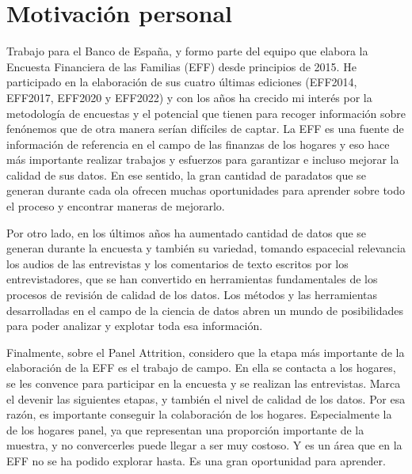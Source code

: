 \section{Motivación personal}

Trabajo para el Banco de España, y formo parte del equipo que elabora la Encuesta Financiera de las Familias (EFF) desde principios de 2015. He participado en la elaboración de sus cuatro últimas ediciones (EFF2014, EFF2017, EFF2020 y EFF2022) y con los años ha crecido mi interés por la metodología de encuestas y el potencial que tienen para recoger información sobre fenónemos que de otra manera serían difíciles de captar. La EFF es una fuente de información de referencia en el campo de las finanzas de los hogares y eso hace más importante realizar trabajos y esfuerzos para garantizar e incluso mejorar la calidad de sus datos. En ese sentido, la gran cantidad de paradatos que se generan durante cada ola ofrecen muchas oportunidades para aprender sobre todo el proceso y encontrar maneras de mejorarlo.

Por otro lado, en los últimos años ha aumentado cantidad de datos que se generan durante la encuesta y también su variedad, tomando espacecial relevancia los audios de las entrevistas y los comentarios de texto escritos por los entrevistadores, que se han convertido en herramientas fundamentales de los procesos de revisión de calidad de los datos. Los métodos y las herramientas desarrolladas en el campo de la ciencia de datos abren un mundo de posibilidades para poder analizar y explotar toda esa información.

Finalmente, sobre el Panel Attrition, considero que la etapa más importante de la elaboración de la EFF es el trabajo de campo. En ella se contacta a los hogares, se les convence para participar en la encuesta y se realizan las entrevistas. Marca el devenir las siguientes etapas, y también el nivel de calidad de los datos. Por esa razón, es importante conseguir la colaboración de los hogares. Especialmente la de los hogares panel, ya que representan una proporción importante de la muestra, y no convercerles puede llegar a ser muy costoso. Y es un área que en la EFF no se ha podido explorar hasta. Es una gran oportunidad para aprender.
